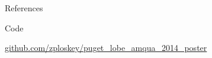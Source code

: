 \documentclass{beamer}
\begin{document}
\begin{frame}{}
\begin{columns}[T]
\begin{column}{.32\columnwidth}
\begin{block}{References}
{\begin{itemize}
\end{itemize}

} %
\end{block}

\begin{block}{Code}
	
	\center \url{github.com/zploskey/puget_lobe_amqua_2014_poster} 
	
\end{block}

\end{column}
\end{columns}

\end{frame}
\end{document}
